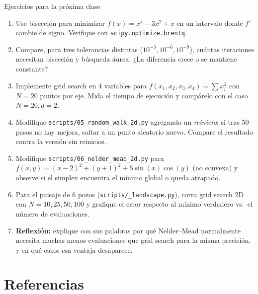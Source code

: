 \documentclass[aspectratio=169,10pt]{beamer}
\begin{document}
\begin{frame}{Ejercicios para la próxima clase}
  \small
  \begin{enumerate}
    \item Use bisección para minimizar $f(x)=x^4-3x^2+x$ en un intervalo
      donde $f'$ cambie de signo. Verifique con \texttt{scipy.optimize.brentq}.
    \item Compare, para tres tolerancias distintas ($10^{-3},10^{-6},
      10^{-9}$), cuántas iteraciones necesitan bisección y búsqueda
      áurea. ¿La diferencia crece o se mantiene constante?
    \item Implemente grid search en 4 variables para
      $f(x_1,x_2,x_3,x_4)=\sum x_i^2$ con $N=20$ puntos por eje. Mida el
      tiempo de ejecución y compárelo con el caso $N=20,d=2$.
    \item Modifique \texttt{scripts/05\_random\_walk\_2d.py} agregando un
      \emph{reinicio}: si tras 50 pasos no hay mejora, saltar a un punto
      aleatorio nuevo. Compare el resultado contra la versión sin
      reinicios.
    \item Modifique \texttt{scripts/06\_nelder\_mead\_2d.py} para
      $f(x,y)=(x-2)^2+(y+1)^2 + 5\sin(x)\cos(y)$ (no convexa) y observe si
      el simplex encuentra el mínimo global o queda atrapado.
    \item Para el paisaje de 6 pozos (\texttt{scripts/\_landscape.py}),
      corra grid search 2D con $N=10,25,50,100$ y grafique el error
      respecto al mínimo verdadero vs.\ el número de evaluaciones.
    \item \textbf{Reflexión:} explique con sus palabras por qué Nelder--Mead
      normalmente necesita muchas menos evaluaciones que grid search para
      la misma precisión, y en qué casos esa ventaja desaparece.
  \end{enumerate}
\end{frame}

\section{Referencias}
\end{document}
